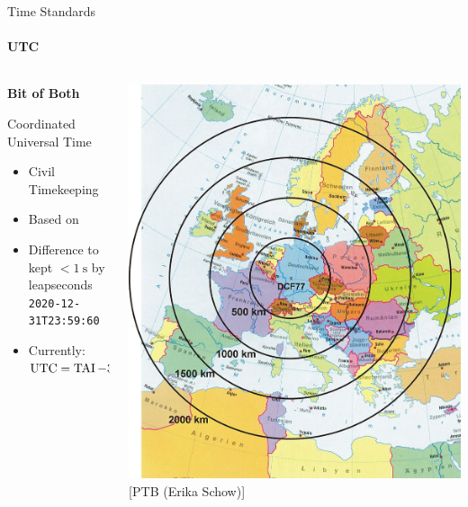 \documentclass[aspectratio=1610, 9pt]{beamer}
\begin{document}
\begin{frame}[c]{Time Standards}
  \framesubtitle{UTC}
  \begin{columns}[c, onlytextwidth]
    \begin{column}{0.5\textwidth}
      \centering
      \textbf{\Large Bit of Both}\\[0.5\baselineskip]%
      \begin{description}[UTC]
        \item[UTC] Coordinated Universal Time
        \begin{itemize}
          \item Civil Timekeeping
          \item Based on \TAI
          \item Difference to \UT{} kept $<\SI{1}{\second}$ by leapseconds \\
            \texttt{2020-12-31T23:59:60}
          \item Currently: $\operatorname{UTC} = \operatorname{TAI} - \SI{37}{\second}$
        \end{itemize}
      \end{description}
    \end{column}
    \hfill
    \begin{column}{0.5\textwidth}
      \includegraphics[height=0.9\textheight]{images/dcf77.jpg}\\[-1.2\baselineskip]
      \hspace{2em}[PTB (Erika Schow)]
    \end{column}
  \end{columns}
\end{frame}
\end{document}

